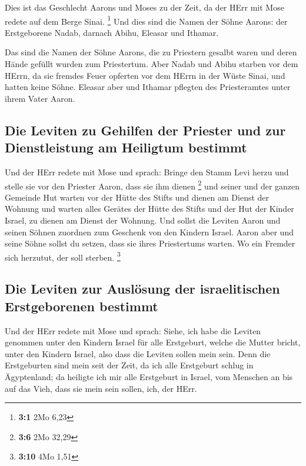  Dies ist das Geschlecht Aarons und Moses zu der Zeit, da
der HErr mit Mose redete auf dem Berge Sinai. \footnote{\textbf{3:1} 2Mo
  6,23}  Und dies sind die Namen der Söhne Aarons: der
Erstgeborene Nadab, darnach Abihu, Eleasar und Ithamar.

 Das sind die Namen der Söhne Aarons, die zu Priestern
gesalbt waren und deren Hände gefüllt wurden zum Priestertum.
 Aber Nadab und Abihu starben vor dem HErrn, da sie
fremdes Feuer opferten vor dem HErrn in der Wüste Sinai, und hatten
keine Söhne. Eleasar aber und Ithamar pflegten des Priesteramtes unter
ihrem Vater Aaron.

\hypertarget{die-leviten-zu-gehilfen-der-priester-und-zur-dienstleistung-am-heiligtum-bestimmt}{%
\subsection{Die Leviten zu Gehilfen der Priester und zur Dienstleistung
am Heiligtum
bestimmt}\label{die-leviten-zu-gehilfen-der-priester-und-zur-dienstleistung-am-heiligtum-bestimmt}}

 Und der HErr redete mit Mose und sprach: 
Bringe den Stamm Levi herzu und stelle sie vor den Priester Aaron, dass
sie ihm dienen \footnote{\textbf{3:6} 2Mo 32,29}  und
seiner und der ganzen Gemeinde Hut warten vor der Hütte des Stifts und
dienen am Dienst der Wohnung  und warten alles Gerätes der
Hütte des Stifts und der Hut der Kinder Israel, zu dienen am Dienst der
Wohnung.  Und sollst die Leviten Aaron und seinen Söhnen
zuordnen zum Geschenk von den Kindern Israel.  Aaron aber
und seine Söhne sollst du setzen, dass sie ihres Priestertums warten. Wo
ein Fremder sich herzutut, der soll sterben. \footnote{\textbf{3:10} 4Mo
  1,51}

\hypertarget{die-leviten-zur-ausluxf6sung-der-israelitischen-erstgeborenen-bestimmt}{%
\subsection{Die Leviten zur Auslösung der israelitischen Erstgeborenen
bestimmt}\label{die-leviten-zur-ausluxf6sung-der-israelitischen-erstgeborenen-bestimmt}}

 Und der HErr redete mit Mose und sprach: 
Siehe, ich habe die Leviten genommen unter den Kindern Israel für alle
Erstgeburt, welche die Mutter bricht, unter den Kindern Israel, also
dass die Leviten sollen mein sein.  Denn die Erstgeburten
sind mein seit der Zeit, da ich alle Erstgeburt schlug in Ägyptenland;
da heiligte ich mir alle Erstgeburt in Israel, vom Menschen an bis auf
das Vieh, dass sie mein sein sollen, ich, der HErr.


